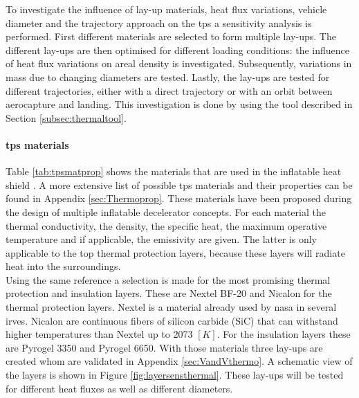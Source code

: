 To investigate the influence of lay-up materials, heat flux variations, vehicle diameter and the trajectory approach on the \gls{tps} a sensitivity analysis is performed. First different materials are selected to form multiple lay-ups. The different lay-ups are then optimised for different loading conditions: the influence of heat flux variations on areal density is investigated. Subsequently, variations in mass due to changing diameters are tested. Lastly, the lay-ups are tested for different trajectories, either with a direct trajectory or with an orbit between aerocapture and landing. This investigation is done by using the tool described in Section \ref{subsec:thermaltool}.

\paragraph{\gls{tps} materials}
Table \ref{tab:tpsmatprop} shows the materials that are used in the inflatable heat shield \cite{Corso2009,Corso2011,DuPont2011,Smith2011,Nye,Zinkle1998}. A more extensive list of possible \gls{tps} materials and their properties can be found in Appendix \ref{sec:Thermoprop}. These materials have been proposed during the design of multiple inflatable decelerator concepts. For each material the thermal conductivity, the density, the specific heat, the maximum operative temperature and if applicable, the emissivity are given. The latter is only applicable to the top  thermal protection layers, because these layers will radiate heat into the surroundings.\\

Using the same reference a selection is made for the most promising thermal protection and insulation layers. These are Nextel BF-20 and Nicalon for the thermal protection layers. Nextel is a material already used by \gls{nasa} in several \gls{irve}s. Nicalon are continuous fibers of silicon carbide (SiC) that can withstand higher temperatures than Nextel up to 2073 $\left[K\right]$. For the insulation layers these are Pyrogel 3350 and Pyrogel 6650. With those materials three lay-ups are created whom are validated in Appendix \ref{sec:VandVthermo}. A schematic view of the layers is shown in Figure \ref{fig:layersensthermal}. These lay-ups will be tested for different heat fluxes as well as different diameters.

